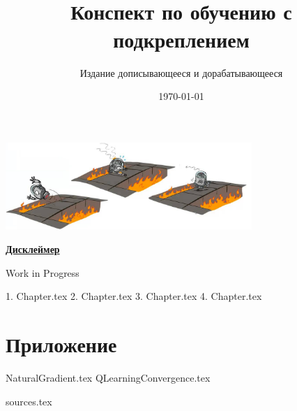 \documentclass[a4paper, 10pt, oneside]{memoir}
\title{
\vspace{4cm}
\normalfont \normalsize 
\horrule{0.5pt} \\[0.4cm]
\huge Конспект по обучению с подкреплением
\horrule{2pt} \\[0.5cm]
}
\author{Издание дописывающееся и дорабатывающееся}
\date{\normalsize\today}
\begin{document}

\maketitle
\thispagestyle{empty}

\begin{center}
    \includegraphics[width=0.7\textwidth]{Images/robot.png}
\end{center}

\vspace{2cm}
\begin{center}
\textcolor{ChadBlue}{\underline{\textbf{Дисклеймер}}}

\vspace{1cm}
Work in Progress
\end{center}


\newpage
\tableofcontents*

{1. Chapter.tex}
{2. Chapter.tex}
{3. Chapter.tex}
{4. Chapter.tex}


\newpage

\appendix

\chapter{Приложение}

{NaturalGradient.tex}
{QLearningConvergence.tex}

{sources.tex}

\end{document}
